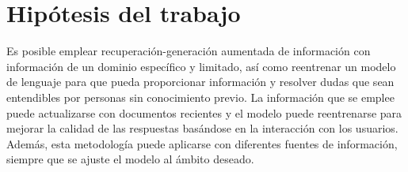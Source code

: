 \section{Hipótesis del trabajo}

Es posible emplear recuperación-generación aumentada de información con información
de un dominio específico y limitado, así como reentrenar un modelo de lenguaje
para que pueda proporcionar información y resolver dudas que sean entendibles
por personas sin conocimiento previo. La información que se emplee puede
actualizarse con documentos recientes y el modelo puede reentrenarse para mejorar
la calidad de las respuestas basándose en la interacción con los usuarios. Además,
esta metodología puede aplicarse con diferentes fuentes de información, siempre
que se ajuste el modelo al ámbito deseado.
